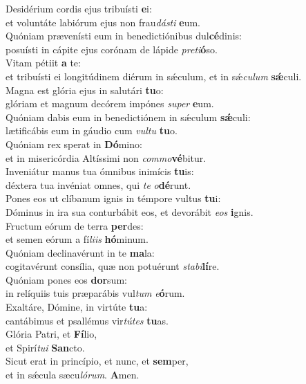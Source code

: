 \evenverse Desidérium cordis ejus tribuísti \textbf{e}i:~\*\\
\evenverse et voluntáte labiórum ejus non frau\textit{dá}\textit{sti} \textbf{e}um.\\
\oddverse Quóniam prævenísti eum in benedictiónibus dul\textbf{cé}dinis:~\*\\
\oddverse posuísti in cápite ejus corónam de lápide \textit{pre}\textit{ti}\textbf{ó}so.\\
\evenverse Vitam pétiit \textbf{a} te:~\*\\
\evenverse et tribuísti ei longitúdinem diérum in sǽculum, et in sǽ\textit{cu}\textit{lum} \textbf{sǽ}culi.\\
\oddverse Magna est glória ejus in salutári \textbf{tu}o:~\*\\
\oddverse glóriam et magnum decórem impónes \textit{su}\textit{per} \textbf{e}um.\\
\evenverse Quóniam dabis eum in benedictiónem in sǽculum \textbf{sǽ}culi:~\*\\
\evenverse lætificábis eum in gáudio cum \textit{vul}\textit{tu} \textbf{tu}o.\\
\oddverse Quóniam rex sperat in \textbf{Dó}mino:~\*\\
\oddverse et in misericórdia Altíssimi non \textit{com}\textit{mo}\textbf{vé}bitur.\\
\evenverse Inveniátur manus tua ómnibus inimícis \textbf{tu}is:~\*\\
\evenverse déxtera tua invéniat omnes, qui \textit{te} \textit{o}\textbf{dé}runt.\\
\oddverse Pones eos ut clíbanum ignis in témpore vultus \textbf{tu}i:~\*\\
\oddverse Dóminus in ira sua conturbábit eos, et devorábit \textit{e}\textit{os} \textbf{i}gnis.\\
\evenverse Fructum eórum de terra \textbf{per}des:~\*\\
\evenverse et semen eórum a fí\textit{li}\textit{is} \textbf{hó}minum.\\
\oddverse Quóniam declinavérunt in te \textbf{ma}la:~\*\\
\oddverse cogitavérunt consília, quæ non potuérunt \textit{sta}\textit{bi}\textbf{lí}re.\\
\evenverse Quóniam pones eos \textbf{dor}sum:~\*\\
\evenverse in relíquiis tuis præparábis vul\textit{tum} \textit{e}\textbf{ó}rum.\\
\oddverse Exaltáre, Dómine, in virtúte \textbf{tu}a:~\*\\
\oddverse cantábimus et psallémus vir\textit{tú}\textit{tes} \textbf{tu}as.\\
\evenverse Glória Patri, et \textbf{Fí}lio,~\*\\
\evenverse et Spirí\textit{tu}\textit{i} \textbf{San}cto.\\
\oddverse Sicut erat in princípio, et nunc, et \textbf{sem}per,~\*\\
\oddverse et in sǽcula sæcu\textit{ló}\textit{rum}. \textbf{A}men.\\
